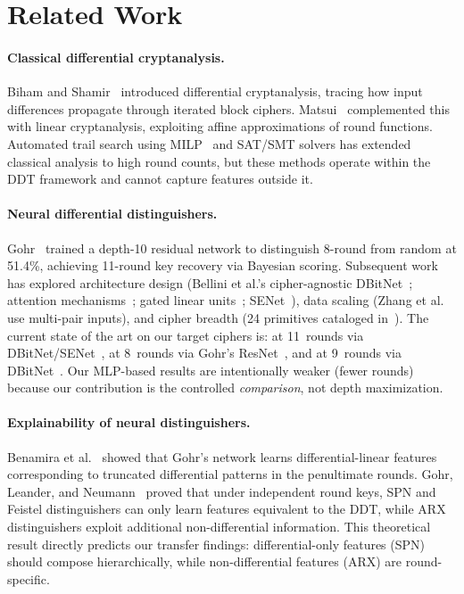 \section{Related Work}
\label{sec:related}

\paragraph{Classical differential cryptanalysis.}
Biham and Shamir~\citep{biham1991differential} introduced differential cryptanalysis, tracing how input differences propagate through iterated block ciphers.
Matsui~\citep{matsui1993linear} complemented this with linear cryptanalysis, exploiting affine approximations of round functions.
Automated trail search using MILP~\citep{mouha2012milp} and SAT/SMT solvers has extended classical analysis to high round counts, but these methods operate within the DDT framework and cannot capture features outside it.

\paragraph{Neural differential distinguishers.}
Gohr~\citep{gohr2019} trained a depth-10 residual network to distinguish 8-round \speck from random at 51.4\%, achieving 11-round key recovery via Bayesian scoring.
Subsequent work has explored architecture design (Bellini et al.'s cipher-agnostic DBitNet~\citep{bellini2023dbitnet}; attention mechanisms~\citep{lee2024attention}; gated linear units~\citep{jang2023glu}; SENet~\citep{bao2022enhancing}), data scaling (Zhang et al.~\citep{zhang2025multipair} use multi-pair inputs), and cipher breadth (24 primitives cataloged in~\citep{gerault2024sok}).
The current state of the art on our target ciphers is:
\simon at 11~rounds via DBitNet/SENet~\citep{bellini2023dbitnet,tian2022simon},
\speck at 8~rounds via Gohr's ResNet~\citep{gohr2019},
and \present at 9~rounds via DBitNet~\citep{bellini2023dbitnet}.
Our MLP-based results are intentionally weaker (fewer rounds) because our contribution is the controlled \emph{comparison}, not depth maximization.

\paragraph{Explainability of neural distinguishers.}
Benamira et al.~\citep{benamira2021deeper} showed that Gohr's network learns differential-linear features corresponding to truncated differential patterns in the penultimate rounds.
Gohr, Leander, and Neumann~\citep{gohr2022assessment} proved that under independent round keys, SPN and Feistel distinguishers can only learn features equivalent to the DDT, while ARX distinguishers exploit additional non-differential information.
This theoretical result directly predicts our transfer findings: differential-only features (SPN) should compose hierarchically, while non-differential features (ARX) are round-specific.

